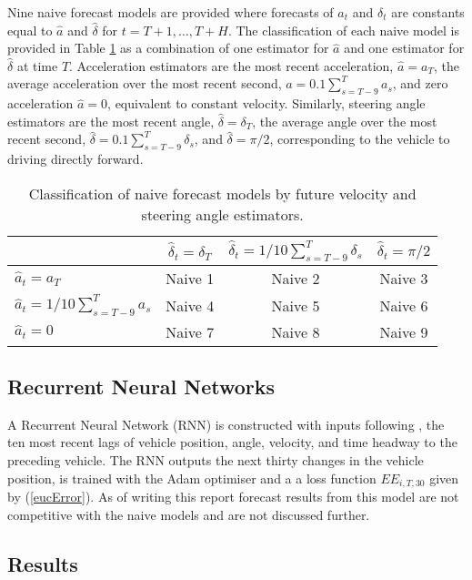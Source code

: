 \documentclass[12pt,a4paper]{article}\usepackage[]{graphicx}\usepackage[]{color}
\begin{document}
Nine naive forecast models are provided where forecasts of $a_t$ and $\delta_t$ are constants equal to $\hat{a}$ and $\hat{\delta}$ for $t = T+1, \dots, T+H$. The classification of each naive model is provided in Table \ref{tableNaive} as a combination of one estimator for $\hat{a}$ and one estimator for $\hat{\delta}$ at time $T$. Acceleration estimators are the most recent acceleration, $\hat{a} = a_T$, the average acceleration over the most recent second, $\hat{a} = 0.1 \sum_{s = T-9}^T a_s$, and zero acceleration $\hat{a} = 0$, equivalent to constant velocity. Similarly, steering angle estimators are the most recent angle, $\hat{\delta} = \delta_T$, the average angle over the most recent second, $\hat{\delta} = 0.1 \sum_{s = T - 9}^T \delta_s$, and $\hat{\delta} = \pi/2$, corresponding to the vehicle to driving directly forward.
\begin{table}
\begin{center}
\begin{tabular}{|l|c|c|c|}
\hline
& $\hat{\delta}_t = \delta_T$ & $\hat{\delta}_t = 1/10 \sum_{s=T-9}^T \delta_s$ & $\hat{\delta}_t = \pi/2$ \\
\hline
$\hat{a}_t = a_T$ & Naive 1 & Naive 2 & Naive 3 \\
$\hat{a}_t = 1/10\sum_{s=T-9}^T a_s$ & Naive 4 & Naive 5 & Naive 6\\
$\hat{a}_t = 0$ & Naive 7 & Naive 8 & Naive 9 \\
\hline
\end{tabular}
\end{center}
\caption{Classification of naive forecast models by future velocity and steering angle estimators.}
\label{tableNaive}
\end{table}

\subsection{Recurrent Neural Networks}
\label{subsec:RNN}
A Recurrent Neural Network (RNN) is constructed with inputs following \citet{Ding2013}, the ten most recent lags of vehicle position, angle, velocity, and time headway to the preceding vehicle. The RNN outputs the next thirty changes in the vehicle position, is trained with the Adam optimiser and a a loss function $EE_{i, T, 30}$ given by (\ref{eucError}). As of writing this report forecast results from this model are not competitive with the naive models and are not discussed further.

\subsection{Results}
\label{subsec:Results}
\end{document}
